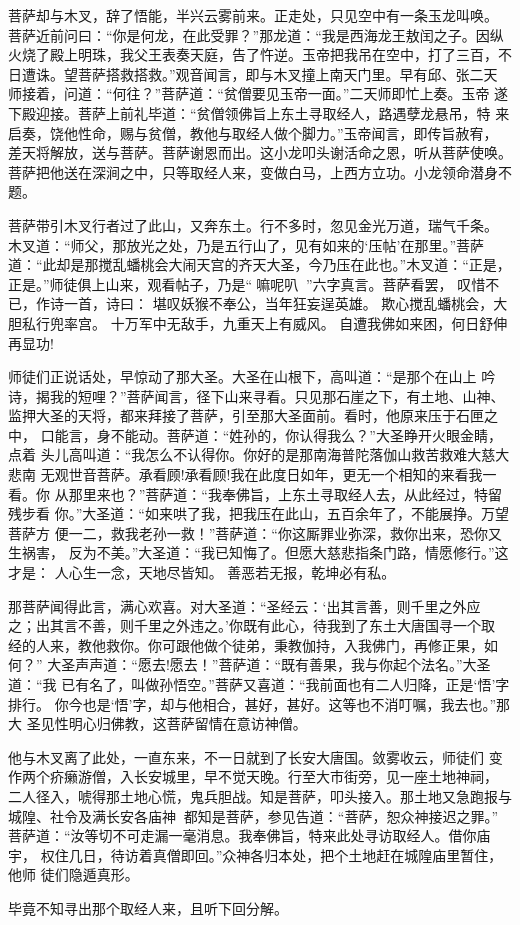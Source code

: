 菩萨却与木叉，辞了悟能，半兴云雾前来。正走处，只见空中有一条玉龙叫唤。
菩萨近前问曰：“你是何龙，在此受罪？”那龙道：“我是西海龙王敖闰之子。因纵
火烧了殿上明珠，我父王表奏天庭，告了忤逆。玉帝把我吊在空中，打了三百，不
日遭诛。望菩萨搭救搭救。”观音闻言，即与木叉撞上南天门里。早有邱、张二天
师接着，问道：“何往？”菩萨道：“贫僧要见玉帝一面。”二天师即忙上奏。玉帝
遂下殿迎接。菩萨上前礼毕道：“贫僧领佛旨上东土寻取经人，路遇孽龙悬吊，特
来启奏，饶他性命，赐与贫僧，教他与取经人做个脚力。”玉帝闻言，即传旨赦宥，
差天将解放，送与菩萨。菩萨谢恩而出。这小龙叩头谢活命之恩，听从菩萨使唤。
菩萨把他送在深涧之中，只等取经人来，变做白马，上西方立功。小龙领命潜身不
题。

菩萨带引木叉行者过了此山，又奔东土。行不多时，忽见金光万道，瑞气千条。
木叉道：“师父，那放光之处，乃是五行山了，见有如来的‘压帖’在那里。”菩萨
道：“此却是那搅乱蟠桃会大闹天宫的齐天大圣，今乃压在此也。”木叉道：“正是，
正是。”师徒俱上山来，观看帖子，乃是“嘛呢叭”六字真言。菩萨看罢，
叹惜不已，作诗一首，诗曰：
堪叹妖猴不奉公，当年狂妄逞英雄。
欺心搅乱蟠桃会，大胆私行兜率宫。
十万军中无敌手，九重天上有威风。
自遭我佛如来困，何日舒伸再显功!

师徒们正说话处，早惊动了那大圣。大圣在山根下，高叫道：“是那个在山上
吟诗，揭我的短哩？”菩萨闻言，径下山来寻看。只见那石崖之下，有土地、山神、
监押大圣的天将，都来拜接了菩萨，引至那大圣面前。看时，他原来压于石匣之中，
口能言，身不能动。菩萨道：“姓孙的，你认得我么？”大圣睁开火眼金睛，点着
头儿高叫道：“我怎么不认得你。你好的是那南海普陀落伽山救苦救难大慈大悲南
无观世音菩萨。承看顾!承看顾!我在此度日如年，更无一个相知的来看我一看。你
从那里来也？”菩萨道：“我奉佛旨，上东土寻取经人去，从此经过，特留残步看
你。”大圣道：“如来哄了我，把我压在此山，五百余年了，不能展挣。万望菩萨方
便一二，救我老孙一救！”菩萨道：“你这厮罪业弥深，救你出来，恐你又生祸害，
反为不美。”大圣道：“我已知悔了。但愿大慈悲指条门路，情愿修行。”这才是：
人心生一念，天地尽皆知。
善恶若无报，乾坤必有私。

那菩萨闻得此言，满心欢喜。对大圣道：“圣经云：‘出其言善，则千里之外应
之；出其言不善，则千里之外违之。’你既有此心，待我到了东土大唐国寻一个取
经的人来，教他救你。你可跟他做个徒弟，秉教伽持，入我佛门，再修正果，如何？”
大圣声声道：“愿去!愿去！”菩萨道：“既有善果，我与你起个法名。”大圣道：“我
已有名了，叫做孙悟空。”菩萨又喜道：“我前面也有二人归降，正是‘悟’字排行。
你今也是‘悟’字，却与他相合，甚好，甚好。这等也不消叮嘱，我去也。”那大
圣见性明心归佛教，这菩萨留情在意访神僧。

他与木叉离了此处，一直东来，不一日就到了长安大唐国。敛雾收云，师徒们
变作两个疥癞游僧，入长安城里，早不觉天晚。行至大市街旁，见一座土地神祠，
二人径入，唬得那土地心慌，鬼兵胆战。知是菩萨，叩头接入。那土地又急跑报与
城隍、社令及满长安各庙神，都知是菩萨，参见告道：“菩萨，恕众神接迟之罪。”
菩萨道：“汝等切不可走漏一毫消息。我奉佛旨，特来此处寻访取经人。借你庙宇，
权住几日，待访着真僧即回。”众神各归本处，把个土地赶在城隍庙里暂住，他师
徒们隐遁真形。

毕竟不知寻出那个取经人来，且听下回分解。
